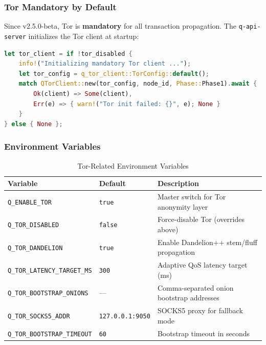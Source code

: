 \documentclass[11pt,a4paper]{article}
\begin{document}
\subsubsection{Tor Mandatory by Default}

Since v2.5.0-beta, Tor is \textbf{mandatory} for all transaction propagation. The \texttt{q-api-server} initializes the Tor client at startup:

\begin{lstlisting}[language=Rust, caption=Mandatory Tor Initialization (main.rs)]
let tor_client = if !tor_disabled {
    info!("Initializing mandatory Tor client ...");
    let tor_config = q_tor_client::TorConfig::default();
    match QTorClient::new(tor_config, node_id, Phase::Phase1).await {
        Ok(client) => Some(client),
        Err(e) => { warn!("Tor init failed: {}", e); None }
    }
} else { None };
\end{lstlisting}

\subsubsection{Environment Variables}

\begin{table}[H]
\centering
\caption{Tor-Related Environment Variables}
\label{tab:env_vars}
\begin{tabular}{@{}lp{2cm}p{6.5cm}@{}}
\toprule
\textbf{Variable} & \textbf{Default} & \textbf{Description} \\
\midrule
\texttt{Q\_ENABLE\_TOR} & \texttt{true} & Master switch for Tor anonymity layer \\
\texttt{Q\_TOR\_DISABLED} & \texttt{false} & Force-disable Tor (overrides above) \\
\texttt{Q\_TOR\_DANDELION} & \texttt{true} & Enable Dandelion++ stem/fluff propagation \\
\texttt{Q\_TOR\_LATENCY\_TARGET\_MS} & \texttt{300} & Adaptive QoS latency target (ms) \\
\texttt{Q\_TOR\_BOOTSTRAP\_ONIONS} & --- & Comma-separated onion bootstrap addresses \\
\texttt{Q\_TOR\_SOCKS5\_ADDR} & \texttt{127.0.0.1:9050} & SOCKS5 proxy for fallback mode \\
\texttt{Q\_TOR\_BOOTSTRAP\_TIMEOUT} & \texttt{60} & Bootstrap timeout in seconds \\
\bottomrule
\end{tabular}
\end{table}
\end{document}
